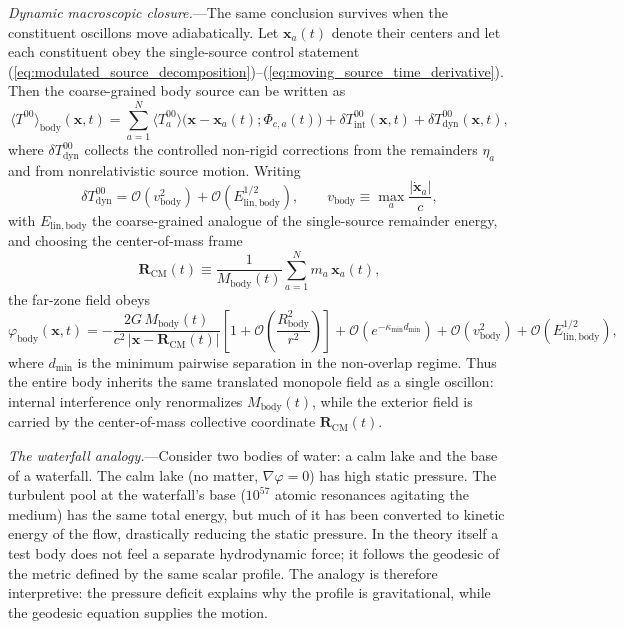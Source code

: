 \documentclass[aps,prd,onecolumn,superscriptaddress,nofootinbib,showpacs,12pt,notitlepage]{revtex4-2}
\renewcommand{\order}[1]{\mathcal{O}\!\left(#1\right)}
\begin{document}
\textit{Dynamic macroscopic closure.}---The same conclusion survives
when the constituent oscillons move adiabatically.  Let
$\mathbf{x}_a(t)$ denote their centers and let each constituent obey
the single-source control statement
(\ref{eq:modulated_source_decomposition})--(\ref{eq:moving_source_time_derivative}).
Then the coarse-grained body source can be written as
\begin{equation}\label{eq:body_dynamic_source}
  \langle T^{00}\rangle_{\mathrm{body}}(\mathbf{x},t)
  = \sum_{a=1}^{N}
    \langle T^{00}_{a}\rangle\bigl(\mathbf{x}-\mathbf{x}_a(t);\Phi_{c,a}(t)\bigr)
  + \delta T^{00}_{\mathrm{int}}(\mathbf{x},t)
  + \delta T^{00}_{\mathrm{dyn}}(\mathbf{x},t),
\end{equation}
where $\delta T^{00}_{\mathrm{dyn}}$ collects the controlled
non-rigid corrections from the remainders $\eta_a$ and from
nonrelativistic source motion.  Writing
\begin{equation}\label{eq:body_remainder_control}
  \delta T^{00}_{\mathrm{dyn}}
  = \order{v_{\mathrm{body}}^2}
  + \order{E_{\mathrm{lin,body}}^{1/2}},
  \qquad
  v_{\mathrm{body}} \equiv \max_a \frac{|\dot{\mathbf{x}}_a|}{c},
\end{equation}
with $E_{\mathrm{lin,body}}$ the coarse-grained analogue of the
single-source remainder energy, and choosing the center-of-mass frame
\begin{equation}\label{eq:body_center_of_mass}
  \mathbf{R}_{\mathrm{CM}}(t)
  \equiv \frac{1}{M_{\mathrm{body}}(t)}
  \sum_{a=1}^{N} m_a\,\mathbf{x}_a(t),
\end{equation}
the far-zone field obeys
\begin{equation}\label{eq:body_dynamic_far_zone}
  \varphi_{\mathrm{body}}(\mathbf{x},t)
  = -\frac{2G\,M_{\mathrm{body}}(t)}
      {c^2\,|\mathbf{x}-\mathbf{R}_{\mathrm{CM}}(t)|}
    \left[1 + \order{\frac{R_{\mathrm{body}}^2}{r^2}}\right]
    + \order{e^{-\kappa_{\min} d_{\min}}}
    + \order{v_{\mathrm{body}}^2}
    + \order{E_{\mathrm{lin,body}}^{1/2}},
\end{equation}
where $d_{\min}$ is the minimum pairwise separation in the non-overlap
regime.  Thus the entire body inherits the same translated monopole
field as a single oscillon: internal interference only renormalizes
$M_{\mathrm{body}}(t)$, while the exterior field is carried by the
center-of-mass collective coordinate $\mathbf{R}_{\mathrm{CM}}(t)$.

\textit{The waterfall analogy.}---Consider two bodies
of water: a calm lake and the base of a waterfall.
The calm lake (no matter, $\nabla\varphi = 0$) has
high static pressure.  The turbulent pool at the waterfall's
base ($10^{57}$ atomic resonances agitating the medium)
has the same total energy, but much of it has been
converted to kinetic energy of the flow, drastically
reducing the static pressure.  In the theory itself a test
body does not feel a separate hydrodynamic force; it follows
the geodesic of the metric defined by the same scalar profile.
The analogy is therefore interpretive: the pressure deficit
explains why the profile is gravitational, while the geodesic
equation supplies the motion.
\end{document}
